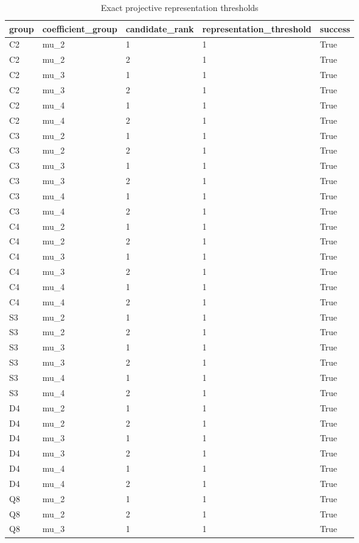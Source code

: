 \begin{table}[t]
\centering
\caption{Exact projective representation thresholds}
\begin{tabular}{lllll}
\toprule
group & coefficient\_group & candidate\_rank & representation\_threshold & success \\
\midrule
C2 & mu\_2 & 1 & 1 & True \\
C2 & mu\_2 & 2 & 1 & True \\
C2 & mu\_3 & 1 & 1 & True \\
C2 & mu\_3 & 2 & 1 & True \\
C2 & mu\_4 & 1 & 1 & True \\
C2 & mu\_4 & 2 & 1 & True \\
C3 & mu\_2 & 1 & 1 & True \\
C3 & mu\_2 & 2 & 1 & True \\
C3 & mu\_3 & 1 & 1 & True \\
C3 & mu\_3 & 2 & 1 & True \\
C3 & mu\_4 & 1 & 1 & True \\
C3 & mu\_4 & 2 & 1 & True \\
C4 & mu\_2 & 1 & 1 & True \\
C4 & mu\_2 & 2 & 1 & True \\
C4 & mu\_3 & 1 & 1 & True \\
C4 & mu\_3 & 2 & 1 & True \\
C4 & mu\_4 & 1 & 1 & True \\
C4 & mu\_4 & 2 & 1 & True \\
S3 & mu\_2 & 1 & 1 & True \\
S3 & mu\_2 & 2 & 1 & True \\
S3 & mu\_3 & 1 & 1 & True \\
S3 & mu\_3 & 2 & 1 & True \\
S3 & mu\_4 & 1 & 1 & True \\
S3 & mu\_4 & 2 & 1 & True \\
D4 & mu\_2 & 1 & 1 & True \\
D4 & mu\_2 & 2 & 1 & True \\
D4 & mu\_3 & 1 & 1 & True \\
D4 & mu\_3 & 2 & 1 & True \\
D4 & mu\_4 & 1 & 1 & True \\
D4 & mu\_4 & 2 & 1 & True \\
Q8 & mu\_2 & 1 & 1 & True \\
Q8 & mu\_2 & 2 & 1 & True \\
Q8 & mu\_3 & 1 & 1 & True \\

\end{tabular}
\end{table}
